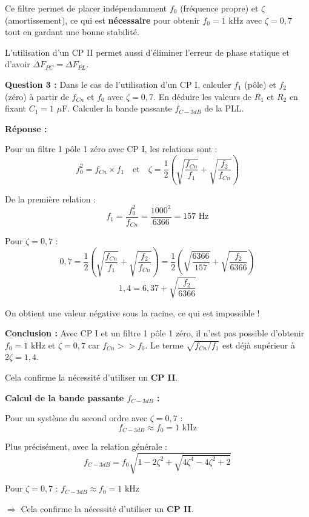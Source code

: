 \documentclass[a4paper,11pt]{article}
\begin{document}
Ce filtre permet de placer indépendamment $f_0$ (fréquence propre) et $\zeta$ (amortissement), ce qui est \textbf{nécessaire} pour obtenir $f_0 = 1$ kHz avec $\zeta = 0{,}7$ tout en gardant une bonne stabilité.

L'utilisation d'un CP II permet aussi d'éliminer l'erreur de phase statique et d'avoir $\Delta F_{PC} = \Delta F_{PL}$.

\vspace{0.5cm}
\textbf{Question 3 :} Dans le cas de l'utilisation d'un CP I, calculer $f_1$ (pôle) et $f_2$ (zéro) à partir de $f_{Cn}$ et $f_0$ avec $\zeta = 0{,}7$. En déduire les valeurs de $R_1$ et $R_2$ en fixant $C_1 = 1$ $\mu$F. Calculer la bande passante $f_{C-3dB}$ de la PLL.

\vspace{0.3cm}
\textbf{Réponse :}

Pour un filtre 1 pôle 1 zéro avec CP I, les relations sont :
\[
f_0^2 = f_{Cn} \times f_1 \quad \text{et} \quad \zeta = \frac{1}{2}\left(\sqrt{\frac{f_{Cn}}{f_1}} + \sqrt{\frac{f_2}{f_{Cn}}}\right)
\]

De la première relation :
\[
f_1 = \frac{f_0^2}{f_{Cn}} = \frac{1000^2}{6366} = \boxed{157 \text{ Hz}}
\]

Pour $\zeta = 0{,}7$ :
\[
0{,}7 = \frac{1}{2}\left(\sqrt{\frac{f_{Cn}}{f_1}} + \sqrt{\frac{f_2}{f_{Cn}}}\right) = \frac{1}{2}\left(\sqrt{\frac{6366}{157}} + \sqrt{\frac{f_2}{6366}}\right)
\]
\[
1{,}4 = 6{,}37 + \sqrt{\frac{f_2}{6366}}
\]

On obtient une valeur négative sous la racine, ce qui est impossible !

\textbf{Conclusion :} Avec CP I et un filtre 1 pôle 1 zéro, il n'est pas possible d'obtenir $f_0 = 1$ kHz et $\zeta = 0{,}7$ car $f_{Cn} >> f_0$. Le terme $\sqrt{f_{Cn}/f_1}$ est déjà supérieur à $2\zeta = 1{,}4$.

Cela confirme la nécessité d'utiliser un \textbf{CP II}.

\textbf{Calcul de la bande passante $f_{C-3dB}$ :}

Pour un système du second ordre avec $\zeta = 0{,}7$ :
\[
f_{C-3dB} \approx f_0 = 1 \text{ kHz}
\]

Plus précisément, avec la relation générale :
\[
f_{C-3dB} = f_0 \sqrt{1 - 2\zeta^2 + \sqrt{4\zeta^4 - 4\zeta^2 + 2}}
\]

Pour $\zeta = 0{,}7$ : $f_{C-3dB} \approx f_0 = \boxed{1 \text{ kHz}}$

$\Rightarrow$ Cela confirme la nécessité d'utiliser un \textbf{CP II}.
\end{document}

